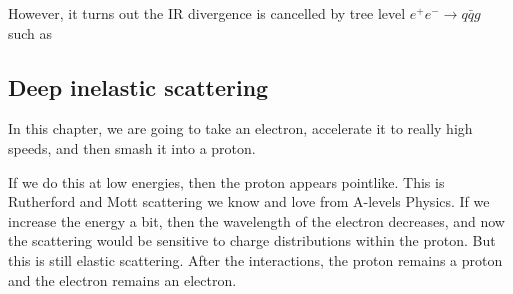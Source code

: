 \documentclass[a4paper]{article}
\begin{document}
However, it turns out the IR divergence is cancelled by tree level $e^+ e^- \to q\bar{q} g$ such as
\begin{center}
\end{center}
\subsection{Deep inelastic scattering}
In this chapter, we are going to take an electron, accelerate it to really high speeds, and then smash it into a proton.

If we do this at low energies, then the proton appears pointlike. This is Rutherford and Mott scattering we know and love from A-levels Physics. If we increase the energy a bit, then the wavelength of the electron decreases, and now the scattering would be sensitive to charge distributions within the proton. But this is still elastic scattering. After the interactions, the proton remains a proton and the electron remains an electron.
\end{document}
